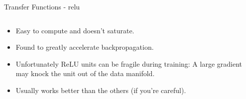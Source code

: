 \begin{frame}{Transfer Functions - relu}
	\begin{columns}
		\begin{column}{0.5\textwidth}
			\begin{itemize}
				\item Easy to compute and doesn't saturate.
				\item Found to greatly accelerate backpropagation.
				\item Unfortunately ReLU units can be fragile during training: A large gradient may knock the unit out of the data manifold.
				\item Usually works better than the others (if you're careful).
			\end{itemize}
		\end{column}
		\begin{column}{0.5\textwidth}
		\end{column}
	\end{columns}
\end{frame}

